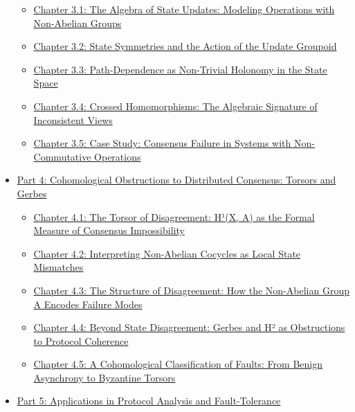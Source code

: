 \documentclass[
]{article}
\providecommand{\tightlist}{%
  \setlength{\itemsep}{0pt}\setlength{\parskip}{0pt}}
\begin{document}
\begin{itemize}
  \begin{itemize}
  \tightlist
  \item
    \hyperref[chapter-3-1-The_Algebra_of_State_Updates__Modeling_O]{Chapter
    3.1: The Algebra of State Updates: Modeling Operations with
    Non-Abelian Groups}
  \item
    \hyperref[chapter-3-2-State_Symmetries_and_the_Action_of_the_U]{Chapter
    3.2: State Symmetries and the Action of the Update Groupoid}
  \item
    \hyperref[chapter-3-3-Path-Dependence_as_Non-Trivial_Holonomy]{Chapter
    3.3: Path-Dependence as Non-Trivial Holonomy in the State Space}
  \item
    \hyperref[chapter-3-4-Crossed_Homomorphisms__The_Algebraic_Sig]{Chapter
    3.4: Crossed Homomorphisms: The Algebraic Signature of Inconsistent
    Views}
  \item
    \hyperref[chapter-3-5-Case_Study__Consensus_Failure_in_Systems]{Chapter
    3.5: Case Study: Consensus Failure in Systems with Non-Commutative
    Operations}
  \end{itemize}
\item
  \hyperref[part-4-Cohomological_Obstructions_to_Distribute]{Part 4:
  Cohomological Obstructions to Distributed Consensus: Torsors and
  Gerbes}

  \begin{itemize}
  \tightlist
  \item
    \hyperref[chapter-4-1-The_Torsor_of_Disagreement__Huxb9_X__A__as]{Chapter
    4.1: The Torsor of Disagreement: H¹(X, A) as the Formal Measure of
    Consensus Impossibility}
  \item
    \hyperref[chapter-4-2-Interpreting_Non-Abelian_Cocycles_as_Loc]{Chapter
    4.2: Interpreting Non-Abelian Cocycles as Local State Mismatches}
  \item
    \hyperref[chapter-4-3-The_Structure_of_Disagreement__How_the_N]{Chapter
    4.3: The Structure of Disagreement: How the Non-Abelian Group A
    Encodes Failure Modes}
  \item
    \hyperref[chapter-4-4-Beyond_State_Disagreement__Gerbes_and_Huxb2]{Chapter
    4.4: Beyond State Disagreement: Gerbes and H² as Obstructions to
    Protocol Coherence}
  \item
    \hyperref[chapter-4-5-A_Cohomological_Classification_of_Faults]{Chapter
    4.5: A Cohomological Classification of Faults: From Benign
    Asynchrony to Byzantine Torsors}
  \end{itemize}
\item
  \hyperref[part-5-Applications_in_Protocol_Analysis_and_Fa]{Part 5:
  Applications in Protocol Analysis and Fault-Tolerance}


\end{itemize}
\end{document}
